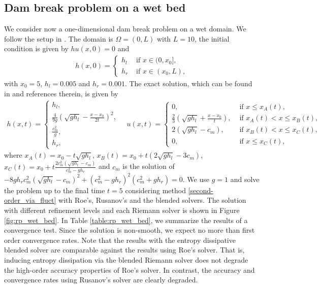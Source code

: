 \documentclass[preprint, 11pt]{article}
\begin{document}
\subsection{Dam break problem on a wet bed}\label{sec:rp_wet_bed}
We consider now a one-dimensional dam break problem on a wet domain.
We follow the setup in \cite[\S 4.1.1]{delestre2013swashes}.
The domain is $\Omega=(0,L)$ with $L=10$, the initial condition is given by
$hu(x,0)=0$ and
\begin{align*}
  h(x,0) =
  \begin{cases}
    h_l & \mbox{ if } x\in(0,x_0], \\
    h_r & \mbox{ if } x\in(x_0,L),
  \end{cases}
\end{align*}
with $x_0=5$, $h_l=0.005$ and $h_r=0.001$.
The exact solution, which can be found in \cite{delestre2013swashes} and references therein,
is given by
\begin{align*}
  h(x,t) =
  \begin{cases}
    h_l, \\
    \frac{4}{9g}\left(\sqrt{gh_l}-\frac{x-x_0}{2t}\right)^2, \\
    \frac{c_m^2}{g}, \\
    h_r,
  \end{cases}
\quad
  u(x,t) =
  \begin{cases}
    0, &\mbox{ if } x\leq x_A(t), \\
    \frac{2}{3}\left(\sqrt{gh_l}+\frac{x-x_0}{t}\right), & \mbox{ if } x_A(t) < x\leq x_B(t), \\
    2(\sqrt{gh_l}-c_m), & \mbox{ if } x_B(t)<x\leq x_C(t), \\
    0, &\mbox{ if } x\leq x_C(t),
  \end{cases}
\end{align*}
where $x_A(t)=x_0-t\sqrt{gh_l}$, $x_B(t)=x_0+t\left(2\sqrt{gh_l}-3c_m\right)$,
$x_C(t)=x_0+t\frac{2c_m^2\left(\sqrt{gh_l}-c_m\right)}{c_m^2-gh_r}$ and
$c_m$ is the solution of
$-8gh_rc_m^2\left(\sqrt{gh_l}-c_m\right)^2+\left(c_m^2-gh_r\right)^2\left(c_m^2+gh_r\right)=0$.
We use $g=1$ and solve the problem up to the final time $t=5$ considering method \eqref{second-order_via_fluct}
with Roe's, Rusanov's and the blended solvers. The solution with different refinement levels
and each Riemann solver is shown in Figure \ref{fig:rp_wet_bed}.
In Table \ref{table:rp_wet_bed}, we summarize the results of a convergence test.
Since the solution is non-smooth, we expect no more than first order convergence rates. Note that the
results with the entropy dissipative blended solver are comparable against the results using Roe's solver.
That is, inducing entropy dissipation via the blended Riemann solver does not degrade the high-order
accuracy properties of Roe's solver.
In contrast, the accuracy and convergence rates using Rusanov's solver are clearly degraded.
\end{document}
